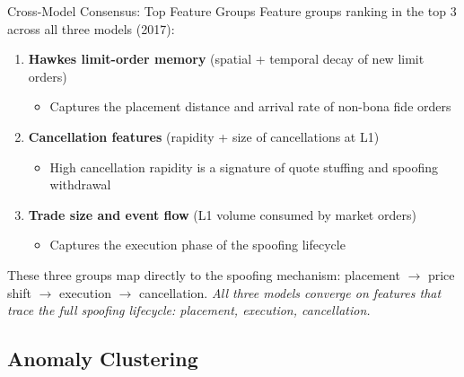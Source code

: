\documentclass{beamer}
\newcommand{\takehome}[1]{%
  \vfill
  {\small\itshape #1}
}
\begin{document}
\begin{frame}{Cross-Model Consensus: Top Feature Groups}
    Feature groups ranking in the top 3 across all three models (2017):
    \vspace{0.2cm}
    \begin{enumerate}
        \item \textbf{Hawkes limit-order memory} (spatial + temporal decay of new limit orders)
            \begin{itemize}
                \item Captures the placement distance and arrival rate of non-bona fide orders
            \end{itemize}
        \item \textbf{Cancellation features} (rapidity + size of cancellations at L1)
            \begin{itemize}
                \item High cancellation rapidity is a signature of quote stuffing and spoofing withdrawal
            \end{itemize}
        \item \textbf{Trade size and event flow} (L1 volume consumed by market orders)
            \begin{itemize}
                \item Captures the execution phase of the spoofing lifecycle
            \end{itemize}
    \end{enumerate}
    \vspace{0.15cm}
    These three groups map directly to the spoofing mechanism: placement $\to$ price shift $\to$ execution $\to$ cancellation.
    \takehome{All three models converge on features that trace the full spoofing lifecycle: placement, execution, cancellation.}
\end{frame}


\subsection{Anomaly Clustering}
\end{document}

